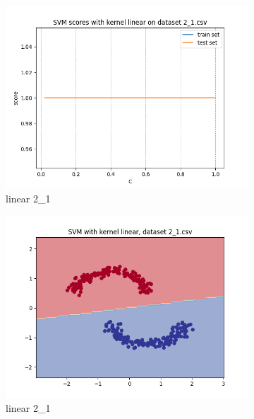 \documentclass[12pt]{article}
\newcommand*{\subfigwidth}{0.24\textwidth}
\begin{document}
\begin{figure}[H]\centering
    \begin{subfigure}[t]{\subfigwidth}
        \includegraphics[width=\linewidth]{img/exp_1/svm/2_1/linear/scores.png}
        \caption{linear 2\_1}
    \end{subfigure}
    \hfill
    \begin{subfigure}[t]{\subfigwidth}
        \includegraphics[width=\linewidth]{img/exp_1/svm/2_1/linear/boundary.png}
        \caption{linear 2\_1}
    \end{subfigure}
    \hfill
    \begin{subfigure}[t]{\subfigwidth}

\end{subfigure}
\end{figure}
\end{document}
